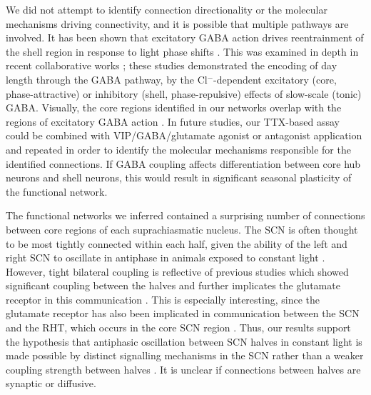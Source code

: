 We did not attempt to identify connection directionality or the molecular mechanisms driving connectivity, and it is possible that multiple pathways are involved.
It has been shown that excitatory GABA action drives reentrainment of the shell region in response to light phase shifts \cite{Albus2005}.
This was examined in depth in recent collaborative works \cite{Myung2015, DeWoskin2015}; these studies demonstrated the encoding of day length through the GABA pathway, by the Cl$^-$-dependent excitatory (core, phase-attractive) or inhibitory (shell, phase-repulsive) effects of slow-scale (tonic) GABA.
Visually, the core regions identified in our networks overlap with the regions of excitatory GABA action \cite{Myung2015}.
In future studies, our TTX-based assay could be combined with VIP/GABA/glutamate agonist or antagonist application and repeated in order to identify the molecular mechanisms responsible for the identified connections.
If GABA coupling affects differentiation between core hub neurons and shell neurons, this would result in significant seasonal plasticity of the functional network.

The functional networks we inferred contained a surprising number of connections between core regions of each suprachiasmatic nucleus.
The SCN is often thought to be most tightly connected within each half, given the ability of the left and right SCN to oscillate in antiphase in animals exposed to constant light \cite{Delaiglesia2000, Ohta2005}.
However, tight bilateral coupling is reflective of previous studies which showed significant coupling between the halves and further implicates the glutamate receptor in this communication \cite{Michel2013}.
This is especially interesting, since the glutamate receptor has also been implicated in communication between the SCN and the RHT, which occurs in the core SCN region \cite{Ebling1996}.
Thus, our results support the hypothesis that antiphasic oscillation between SCN halves in constant light is made possible by distinct signalling mechanisms in the SCN rather than a weaker coupling strength between halves \cite{Indic2008, Michel2013}.
It is unclear if connections between halves are synaptic or diffusive.

